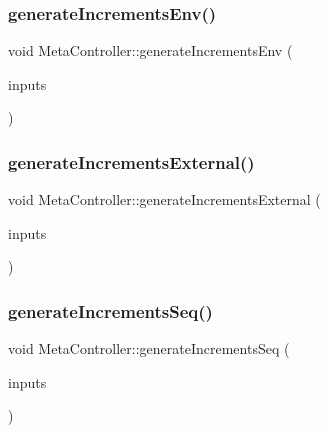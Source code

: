 \mbox{\label{class_meta_controller_ab5edafda7b2d14c42b80d56b3c1aba09}} 
\subsubsection{\texorpdfstring{generate\+Increments\+Env()}{generateIncrementsEnv()}}
{\footnotesize\ttfamily void Meta\+Controller\+::generate\+Increments\+Env (\begin{DoxyParamCaption}\item[{\mbox{\hyperlink{class_via_input_streams}{Via\+Input\+Streams}} $\ast$}]{inputs }\end{DoxyParamCaption})}

\mbox{\label{class_meta_controller_a37edb9a2541a99701a7095c5df577b63}} 
\subsubsection{\texorpdfstring{generate\+Increments\+External()}{generateIncrementsExternal()}}
{\footnotesize\ttfamily void Meta\+Controller\+::generate\+Increments\+External (\begin{DoxyParamCaption}\item[{\mbox{\hyperlink{class_via_input_streams}{Via\+Input\+Streams}} $\ast$}]{inputs }\end{DoxyParamCaption})}

\mbox{\label{class_meta_controller_ab78ff8455308bff2fb7ebff51c33790b}} 
\subsubsection{\texorpdfstring{generate\+Increments\+Seq()}{generateIncrementsSeq()}}
{\footnotesize\ttfamily void Meta\+Controller\+::generate\+Increments\+Seq (\begin{DoxyParamCaption}\item[{\mbox{\hyperlink{class_via_input_streams}{Via\+Input\+Streams}} $\ast$}]{inputs }\end{DoxyParamCaption})}

